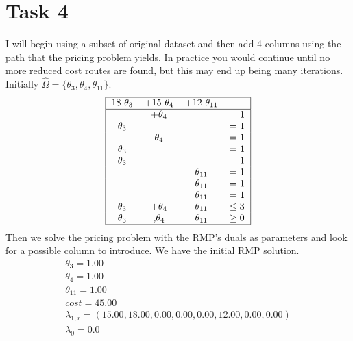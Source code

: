 \documentclass{article}
\begin{document}
    \section{Task 4}
    I will begin using a subset of original dataset and then add 4 columns using the path that the pricing problem yields.
    In practice you would continue until no more reduced cost routes are found, but this may end up being many iterations.
    Initially $\hat{\Omega} = \{ \theta_3, \theta_4, \theta_{11} \}$.
    \[
        \begin{tabular}{ |c c c c | }
            \hline
            18 $\theta_3$ & +15 $\theta_4$ & +12 $\theta_{11}$ &\\
            \hline
            & +$\theta_4$ &          &  = 1 \\
            $\theta_3$ &  &                      &  = 1 \\
                        & $\theta_4$ &           &  = 1 \\
            $\theta_3$ &  &                      &  = 1 \\
            $\theta_3$ &  &                     &  = 1 \\
              &  &      $\theta_{11}$    &  = 1 \\
              &  &      $\theta_{11}$    &  = 1 \\
              &  &      $\theta_{11}$    &  = 1 \\
           $\theta_3$ & +$\theta_4$ & $\theta_{11}$ & $\leq 3$ \\
           $\theta_3$ & ,$\theta_4$ & $\theta_{11}$ & $\geq 0$ \\
            \hline
        \end{tabular}
    \]
    Then we solve the pricing problem with the RMP's duals as parameters and look for a possible column to introduce.
    We have the initial RMP solution.
    \begin{equation*}
        \begin{array}{c}
            \theta_{3} = 1.00\\
            \theta_{4} = 1.00\\
            \theta_{11} = 1.00\\
            cost = 45.00\\
            \lambda_{1,r} = (15.00,18.00,0.00,0.00,0.00,12.00,0.00,0.00)\\
            \lambda_0 = 0.0
        \end{array}
    \end{equation*}
\end{document}
